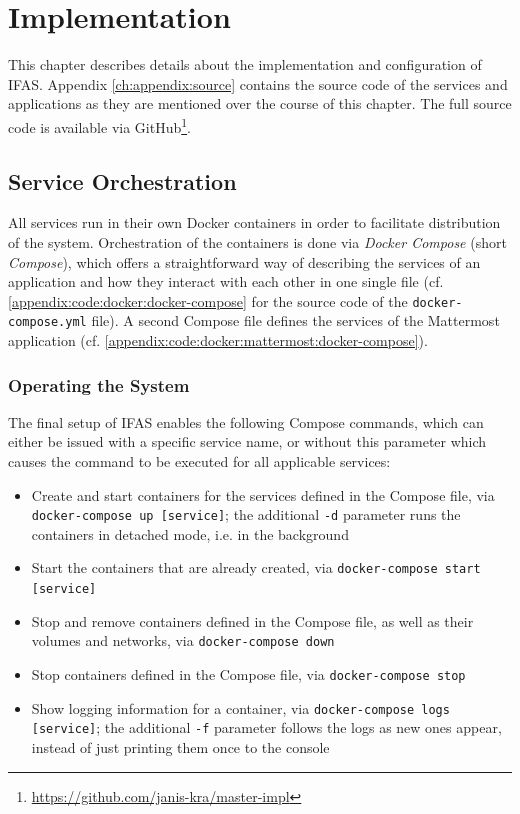%
\chapter{Implementation}
\label{ch:implementation}

This chapter describes details about the implementation and configuration of \acf{IFAS}.
Appendix \cref{ch:appendix:source} contains the source code of the services and applications as they are mentioned over the course of this chapter.
The full source code is available via GitHub\footnote{\url{https://github.com/janis-kra/master-impl}}.

\section{Service Orchestration}
\label{sec:implementation:orchestration}

All services run in their own Docker containers in order to facilitate distribution of the system.
Orchestration of the containers is done via \emph{Docker Compose} (short \emph{Compose}), which offers a straightforward way of describing the services of an application and how they interact with each other in one single file (cf. \cref{appendix:code:docker:docker-compose} for the source code of the \texttt{docker-compose.yml} file).
A second Compose file defines the services of the Mattermost application (cf. \cref{appendix:code:docker:mattermost:docker-compose}).

\subsection{Operating the System}

The final setup of \ac{IFAS} enables the following Compose commands, which can either be issued with a specific service name, or without this parameter which causes the command to be executed for all applicable services:

\begin{itemize}
\item Create and start containers for the services defined in the Compose file, via \texttt{docker-compose up [service]}; the additional \texttt{-d} parameter runs the containers in detached mode, i.e. in the background
\item Start the containers that are already created, via \texttt{docker-compose start [service]}
\item Stop and remove containers defined in the Compose file, as well as their volumes and networks, via \texttt{docker-compose down}
\item Stop containers defined in the Compose file, via \texttt{docker-compose stop}
\item Show logging information for a container, via \texttt{docker-compose logs [service]}; the additional \texttt{-f} parameter follows the logs as new ones appear, instead of just printing them once to the  console
\end{itemize}

